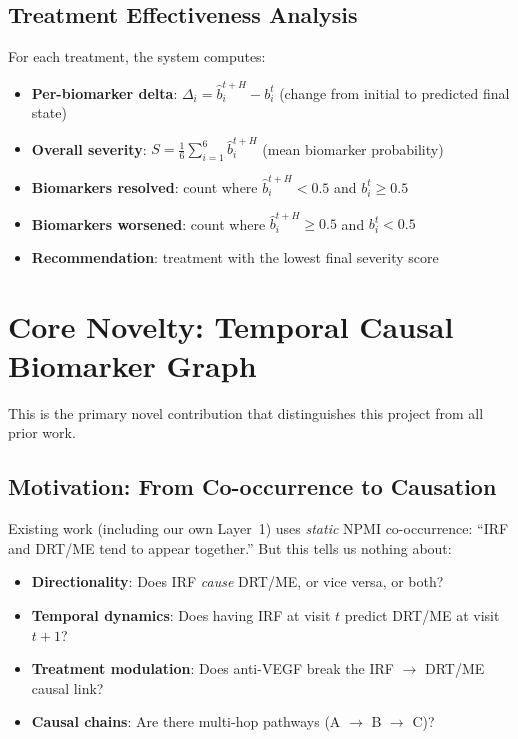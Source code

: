 \documentclass[12pt,a4paper]{article}
\begin{document}
\subsection{Treatment Effectiveness Analysis}

For each treatment, the system computes:
\begin{itemize}[nosep]
  \item \textbf{Per-biomarker delta}: $\Delta_i = \hat{b}_i^{t+H} - b_i^{t}$ (change from initial to predicted final state)
  \item \textbf{Overall severity}: $S = \frac{1}{6}\sum_{i=1}^{6} \hat{b}_i^{t+H}$ (mean biomarker probability)
  \item \textbf{Biomarkers resolved}: count where $\hat{b}_i^{t+H} < 0.5$ and $b_i^t \geq 0.5$
  \item \textbf{Biomarkers worsened}: count where $\hat{b}_i^{t+H} \geq 0.5$ and $b_i^t < 0.5$
  \item \textbf{Recommendation}: treatment with the lowest final severity score
\end{itemize}

\section{Core Novelty: Temporal Causal Biomarker Graph}
\label{sec:novelty}

This is the primary novel contribution that distinguishes this project from all prior work.

\subsection{Motivation: From Co-occurrence to Causation}

Existing work (including our own Layer~1) uses \emph{static} NPMI co-occurrence: ``IRF and DRT/ME tend to appear together.'' But this tells us nothing about:
\begin{itemize}[nosep]
  \item \textbf{Directionality}: Does IRF \emph{cause} DRT/ME, or vice versa, or both?
  \item \textbf{Temporal dynamics}: Does having IRF at visit $t$ predict DRT/ME at visit $t{+}1$?
  \item \textbf{Treatment modulation}: Does anti-VEGF break the IRF $\to$ DRT/ME causal link?
  \item \textbf{Causal chains}: Are there multi-hop pathways (A $\to$ B $\to$ C)?
\end{itemize}
\end{document}
